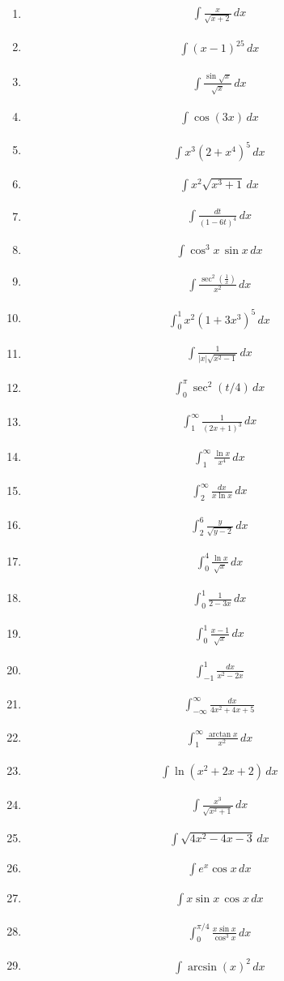 \documentclass[twoside, fleqn,12pt, letterpaper]{article}
\newcommand{\makeitem}[1]{\item \begin{align*} {#1}
  \end{align*}}
\begin{document}
\begin{multicols}{2}
\begin{enumerate}
  \makeitem{\int\frac{x}{\sqrt{x+2}} \, dx}
  
  \makeitem{ \int (x-1)^{25} \, dx} %
  
  \makeitem{\int\frac{\sin\sqrt{x}}{\sqrt{x}} \, dx}
  
  \makeitem{\int \cos(3x) \, dx}
  
  \makeitem{ \int x^3(2+x^4)^5 \, dx}
  
  \makeitem{ \int x^2\sqrt{x^3+1} \, dx}
  
  \makeitem{\int\frac{dt}{(1-6t)^4} \, dx}
  
 \makeitem{\int \cos^3 x\,\sin x \, dx}
  
  \makeitem{\int\frac{\sec^2\left(\frac{1}{x}\right)}{x^2} \, dx}
  
  \makeitem{\int_{0}^{1} x^2(1+3x^3)^5 \, dx}
  
  \makeitem{\int \frac{1}{|x|\sqrt{x^2-1}} \, dx}
  
  \makeitem{\int_{0}^{\pi}\sec^2(t/4) \, dx}
  
  \makeitem{\int_{1}^{\infty}\frac{1}{(2x+1)^3} \, dx}
  
  \makeitem{\int_{1}^{\infty}\frac{\ln x}{x^4} \, dx}
   
  \makeitem{\int_{2}^{\infty}\frac{dx}{x\ln x} \, dx}
  
  \makeitem {\int_{2}^{6}\frac{y}{\sqrt{y-2}} \, dx}
  
  \makeitem {\int_{0}^{4}\frac{\ln x}{\sqrt{x}} \, dx}
  
  \makeitem {\int_{0}^{1}\frac{1}{2-3x} \, dx}
  
  \makeitem {\int_{0}^{1}\frac{x-1}{\sqrt{x}} \, dx}
  
  \makeitem {\int_{-1}^{1}\frac{dx}{x^2-2x}}
  
  \makeitem {\int_{-\infty}^{\infty}\frac{dx}{4x^2+4x+5}}
  
  \makeitem {\int_{1}^{\infty}\frac{\arctan x}{x^2} \, dx}
  
  \makeitem {\int \ln(x^2+2x+2) \, dx}
  
  \makeitem {\int\frac{x^3}{\sqrt{x^2+1}} \, dx}
  
  \makeitem {\int \sqrt{4x^2-4x-3} \, dx}
  
  \makeitem {\int e^{x}\cos x \, dx}
  
  \makeitem {\int x\sin x\,\cos x \, dx}
  
  \makeitem {\int_{0}^{\pi/4}\frac{x\sin x}{\cos^3 x} \, dx }
  
  \makeitem {\int \arcsin(x)^2 \, dx}
  

\end{enumerate}
\end{multicols}
\end{document}
